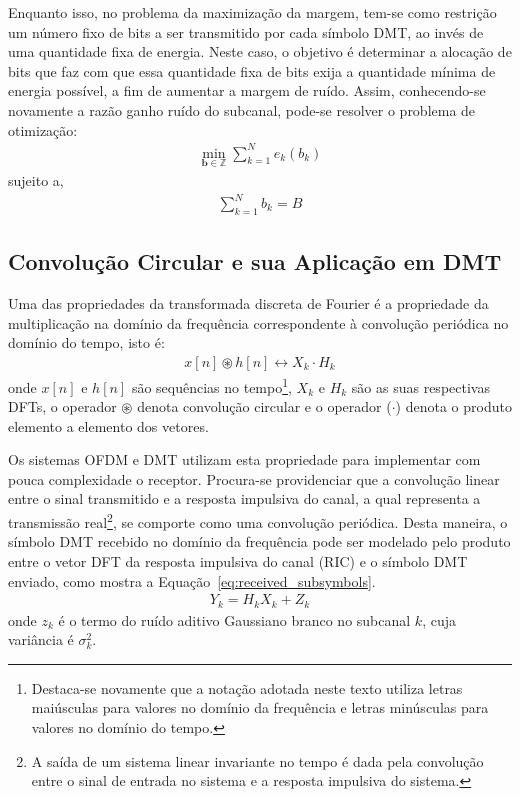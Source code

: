 Enquanto isso, no problema da maximização da margem, tem-se como restrição um número fixo de bits a ser transmitido por cada símbolo DMT, ao invés de uma quantidade fixa de energia. Neste caso, o objetivo é determinar a alocação de bits que faz com que essa quantidade fixa de bits exija a quantidade mínima de energia possível, a fim de aumentar a margem de ruído. Assim, conhecendo-se novamente a razão ganho ruído do subcanal, pode-se resolver o problema de otimização:
\begin{align}
\min_{\mathbf{b} \in \mathbb{Z}} \sum \limits_{k=1}^{N} e_k(b_k) \nonumber
\end{align}
sujeito a, 
\begin{align}
\sum \limits_{k=1}^{N} b_k = B
\end{align}

\subsection{Convolução Circular e sua Aplicação em DMT}

Uma das propriedades da transformada discreta de Fourier é a propriedade da multiplicação na domínio da frequência correspondente à convolução periódica no domínio do tempo, isto é:
\begin{align}
x[n] \circledast h[n] \leftrightarrow X_k \cdot H_k
\end{align}
onde $x[n]$ e $h[n]$ são sequências no tempo\footnote{Destaca-se novamente que a notação adotada neste texto utiliza letras maiúsculas para valores no domínio da frequência e letras minúsculas para valores no domínio do tempo.}, $X_k$ e $H_k$ são as suas respectivas DFTs, o operador $\circledast$ denota convolução circular e o operador ($\cdot$) denota o produto elemento a elemento dos vetores.

Os sistemas OFDM e DMT utilizam esta propriedade para implementar com pouca complexidade o receptor. Procura-se providenciar que a convolução linear entre o sinal transmitido e a resposta impulsiva do canal, a qual representa a transmissão real\footnote{A saída de um sistema linear invariante no tempo é dada pela convolução entre o sinal de entrada no sistema e a resposta impulsiva do sistema.}, se comporte como uma convolução periódica. Desta maneira, o símbolo DMT recebido no domínio da frequência pode ser modelado pelo produto entre o vetor DFT da resposta impulsiva do canal (RIC) e o símbolo DMT enviado, como mostra a Equação~\ref{eq:received_subsymbols}.
\begin{align}
Y_k = H_kX_k + Z_k
\label{eq:received_subsymbols}
\end{align}
onde $z_k$ é o termo do ruído aditivo Gaussiano branco no subcanal $k$, cuja variância é $\sigma_k^2$.

